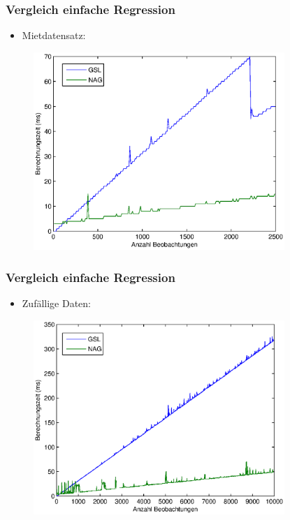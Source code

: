 \documentclass{beamer}
\begin{document}
\begin{frame}
  \frametitle{Vergleich einfache Regression} 
  
  \begin{itemize}
  \item Mietdatensatz:
  \end{itemize}

  \begin{figure}[t]
    \centering
    \includegraphics[width=9.5cm]{figures/simple_reg_comp_rent.eps}
  \end{figure}

\end{frame}

\begin{frame}
  \frametitle{Vergleich einfache Regression}

  \begin{itemize}
  \item Zufällige Daten:
  \end{itemize}
  
  \begin{figure}[t]
    \centering
    \includegraphics[width=9.5cm]{figures/simple_reg_comp.eps}
  \end{figure}

\end{frame}
\end{document}
